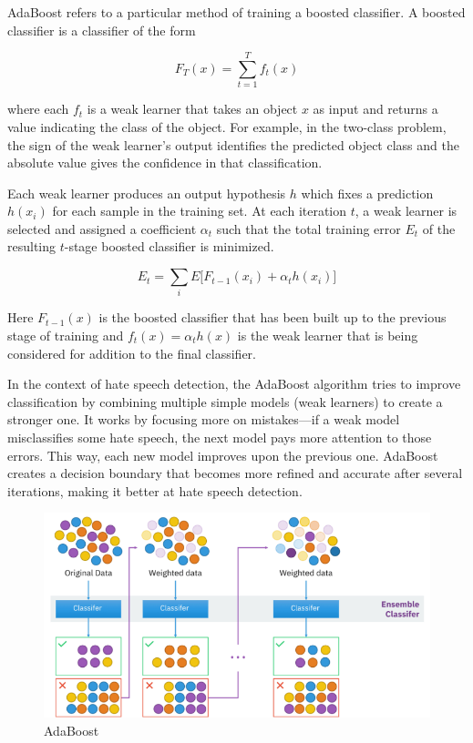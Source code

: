 AdaBoost refers to a particular method of training a boosted classifier. A boosted classifier is a classifier of the form

\[
F_T(x) = \sum_{t=1}^{T} f_t(x)
\]

where each \( f_t \) is a weak learner that takes an object \( x \) as input and returns a value indicating the class of the object. For example, in the two-class problem, the sign of the weak learner's output identifies the predicted object class and the absolute value gives the confidence in that classification.

Each weak learner produces an output hypothesis \( h \) which fixes a prediction \( h(x_i) \) for each sample in the training set. At each iteration \( t \), a weak learner is selected and assigned a coefficient \( \alpha_t \) such that the total training error \( E_t \) of the resulting \( t \)-stage boosted classifier is minimized.

\[
E_t = \sum_{i} E \big[ F_{t-1}(x_i) + \alpha_t h(x_i) \big]
\]

Here \( F_{t-1}(x) \) is the boosted classifier that has been built up to the previous stage of training and 
\( f_t(x) = \alpha_t h(x) \) is the weak learner that is being considered for addition to the final classifier.

In the context of hate speech detection, the AdaBoost algorithm tries to improve classification by combining multiple simple models (weak learners) to create a stronger one. It works by focusing more on mistakes—if a weak model misclassifies some hate speech, the next model pays more attention to those errors. This way, each new model improves upon the previous one. AdaBoost creates a decision boundary that becomes more refined and accurate after several iterations, making it better at hate speech detection.
\begin{figure}
\centering
\includegraphics[scale=0.5]{images/adaboost.png}
\caption{AdaBoost}
\end{figure}

